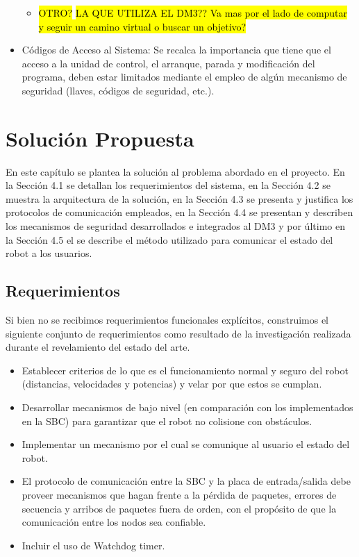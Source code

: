 \documentclass[withindex,glossary]{cam-thesis}
\begin{document}
\begin{itemize}
\begin{itemize}
    \item \hl{OTRO?} \hl{LA QUE UTILIZA EL DM3?? Va mas por el lado de computar y seguir un camino virtual o buscar un objetivo?}
  \end{itemize}
\item Códigos de Acceso al Sistema: Se recalca la importancia que tiene que el acceso a la unidad de control, el arranque, parada y modificación del programa, deben estar limitados mediante el empleo de algún mecanismo de seguridad (llaves, códigos de seguridad, etc.).
\end{itemize}

\chapter{Solución Propuesta}
En este capítulo se plantea la solución al problema abordado en el proyecto. En la Sección 4.1 se detallan los requerimientos del sistema, en la Sección 4.2 se muestra la arquitectura de la solución, en la Sección 4.3 se presenta y justifica los protocolos de comunicación empleados, en la Sección 4.4 se presentan y describen los mecanismos de seguridad desarrollados e integrados al DM3 y por último en la Sección 4.5 el se describe el método utilizado para comunicar el estado del robot a los usuarios.

\section{Requerimientos} \label{sec:Sol Prop :: Requerimientos}
Si bien no se recibimos requerimientos funcionales explícitos, construimos el siguiente conjunto de requerimientos como resultado de la investigación realizada durante el revelamiento del estado del arte.

\begin{itemize}
	\item Establecer criterios de lo que es el funcionamiento normal y seguro del robot (distancias, velocidades y potencias) y velar por que estos se cumplan.
	\item Desarrollar mecanismos de bajo nivel (en comparación con los implementados en la SBC) para garantizar que el robot no colisione con obstáculos.
	\item Implementar un mecanismo por el cual se comunique al usuario el estado del robot.	
	\item El protocolo de comunicación entre la SBC y la placa de entrada/salida debe proveer mecanismos que hagan frente a la pérdida de paquetes, errores de secuencia y arribos de paquetes fuera de orden, con el propósito de que la comunicación entre los nodos sea confiable.
	\item Incluir el uso de Watchdog timer.
\end{itemize}
\end{document}
